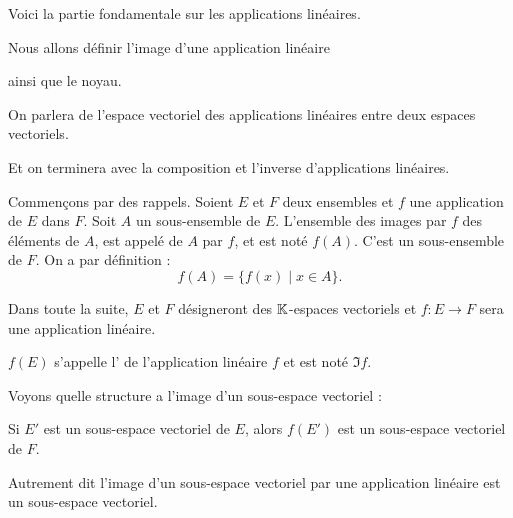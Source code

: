 







\debuttexte


\diapo

\change

Voici la partie fondamentale sur les applications linéaires.

\change

Nous allons définir l'image d'une application linéaire

\change

ainsi que le noyau.

\change

On parlera de l'espace vectoriel des applications linéaires entre deux espaces vectoriels.

\change

Et on terminera avec la composition et l'inverse d'applications linéaires.



\diapo
     
Commençons par des rappels.
Soient $E$ et $F$ deux ensembles et $f$ une application de $E$ dans $F$. 
Soit $A$ un sous-ensemble de $E$. 
L'ensemble des images par $f$ des éléments de $A$, est appelé  
de $A$ par $f$, et est noté $f(A)$. C'est un sous-ensemble de $F$. On a par définition :
$$f(A)=\big\{ f(x)  \mid x\in A \big\}.$$

\change

Dans toute la suite, $E$ et $F$ désigneront des $\mathbb{K}$-espaces vectoriels
et $f : E \to F$ sera une application linéaire.

$f(E)$ s'appelle l' de l'application linéaire $f$ et est noté $\Im f$. 

\change

Voyons quelle structure a l'image d'un sous-espace vectoriel :


 Si $E'$ est un sous-espace vectoriel de $E$, alors $f(E')$ est un sous-espace vectoriel de $F$.
 
 Autrement dit l'image d'un sous-espace vectoriel par une application linéaire est un sous-espace vectoriel.

\change
 
